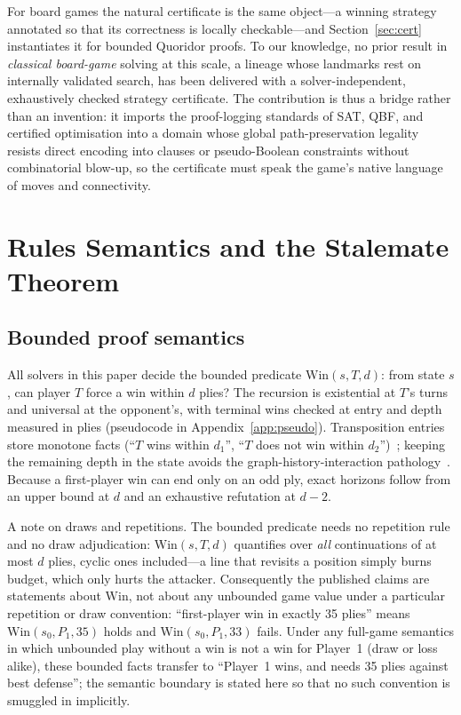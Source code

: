 \documentclass[conference]{IEEEtran}
\begin{document}
For board games the natural certificate is the same object---a winning strategy annotated so that its correctness is locally checkable---and Section~\ref{sec:cert} instantiates it for bounded Quoridor proofs. To our knowledge, no prior result in \emph{classical board-game} solving at this scale, a lineage whose landmarks rest on internally validated search, has been delivered with a solver-independent, exhaustively checked strategy certificate. The contribution is thus a bridge rather than an invention: it imports the proof-logging standards of SAT, QBF, and certified optimisation into a domain whose global path-preservation legality resists direct encoding into clauses or pseudo-Boolean constraints without combinatorial blow-up, so the certificate must speak the game's native language of moves and connectivity.

\section{Rules Semantics and the Stalemate Theorem}
\label{sec:semantics}

\subsection{Bounded proof semantics}

All solvers in this paper decide the bounded predicate $\mathrm{Win}(s,T,d)$: from state $s$, can player $T$ force a win within $d$ plies? The recursion is existential at $T$'s turns and universal at the opponent's, with terminal wins checked at entry and depth measured in plies (pseudocode in Appendix~\ref{app:pseudo}). Transposition entries store monotone facts (``$T$ wins within $d_1$'', ``$T$ does not win within $d_2$'')~\cite{zobrist1970new,knuth1975analysis}; keeping the remaining depth in the state avoids the graph-history-interaction pathology~\cite{kishimoto2004general}. Because a first-player win can end only on an odd ply, exact horizons follow from an upper bound at $d$ and an exhaustive refutation at $d-2$.

A note on draws and repetitions. The bounded predicate needs no repetition rule and no draw adjudication: $\mathrm{Win}(s,T,d)$ quantifies over \emph{all} continuations of at most $d$ plies, cyclic ones included---a line that revisits a position simply burns budget, which only hurts the attacker. Consequently the published claims are statements about $\mathrm{Win}$, not about any unbounded game value under a particular repetition or draw convention: ``first-player win in exactly 35 plies'' means $\mathrm{Win}(s_0,P_1,35)$ holds and $\mathrm{Win}(s_0,P_1,33)$ fails. Under any full-game semantics in which unbounded play without a win is not a win for Player~1 (draw or loss alike), these bounded facts transfer to ``Player~1 wins, and needs 35 plies against best defense''; the semantic boundary is stated here so that no such convention is smuggled in implicitly.
\end{document}
